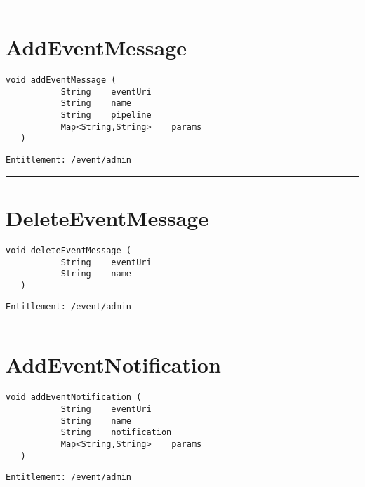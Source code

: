 \rule{12cm}{2pt}
\section{AddEventMessage}
\label{Api:AddEventMessage}
\begin{lstlisting}[style=nonumbers]
   void addEventMessage (
           String    eventUri
           String    name
           String    pipeline
           Map<String,String>    params
   )
\end{lstlisting}
\begin{Verbatim}[formatcom=\color{Maroon}]
  Entitlement: /event/admin
\end{Verbatim}



\rule{12cm}{2pt}
\section{DeleteEventMessage}
\label{Api:DeleteEventMessage}
\begin{lstlisting}[style=nonumbers]
   void deleteEventMessage (
           String    eventUri
           String    name
   )
\end{lstlisting}
\begin{Verbatim}[formatcom=\color{Maroon}]
  Entitlement: /event/admin
\end{Verbatim}



\rule{12cm}{2pt}
\section{AddEventNotification}
\label{Api:AddEventNotification}
\begin{lstlisting}[style=nonumbers]
   void addEventNotification (
           String    eventUri
           String    name
           String    notification
           Map<String,String>    params
   )
\end{lstlisting}
\begin{Verbatim}[formatcom=\color{Maroon}]
  Entitlement: /event/admin
\end{Verbatim}



